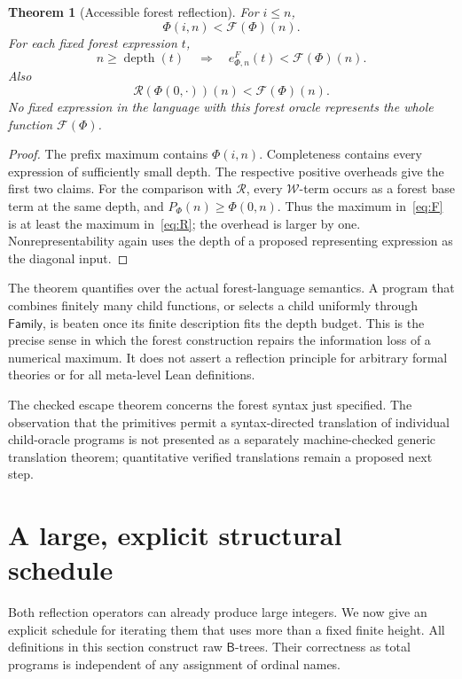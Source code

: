 \documentclass[11pt,a4paper]{article}
\newtheorem{theorem}{Theorem}[section]
\theoremstyle{definition}
\newcommand{\B}{\mathsf B}
\newcommand{\dep}{\operatorname{depth}}
\newcommand{\R}{\mathcal R}
\newcommand{\F}{\mathcal F}
\begin{document}
\begin{theorem}[Accessible forest reflection]
For \(i\le n\),
\[
             \Phi(i,n)<\F(\Phi)(n).
\]
For each fixed forest expression \(t\),
\[
 n\ge\dep(t)\quad\Longrightarrow\quad
 e^F_{\Phi,n}(t)<\F(\Phi)(n).
\]
Also
\[
            \R(\Phi(0,\cdot))(n)<\F(\Phi)(n).
\]
No fixed expression in the language with this forest oracle represents the
whole function \(\F(\Phi)\).
\end{theorem}
\begin{proof}
The prefix maximum contains \(\Phi(i,n)\). Completeness contains every
expression of sufficiently small depth. The respective positive overheads
give the first two claims. For the comparison with \(\R\), every
\(\mathcal W\)-term occurs as a forest base term at the same depth, and
\(P_\Phi(n)\ge\Phi(0,n)\). Thus the maximum in~\eqref{eq:F} is at least the
maximum in~\eqref{eq:R}; the overhead is larger by one. Nonrepresentability
again uses the depth of a proposed representing expression as the diagonal
input.
\end{proof}

The theorem quantifies over the actual forest-language semantics. A program
that combines finitely many child functions, or selects a child uniformly
through \(\mathsf{Family}\), is beaten once its finite description fits the
depth budget. This is the precise sense in which the forest construction
repairs the information loss of a numerical maximum. It does not assert a
reflection principle for arbitrary formal theories or for all meta-level
Lean definitions.

The checked escape theorem concerns the forest syntax just specified.
The observation that the primitives permit a syntax-directed translation
of individual child-oracle programs is not presented as a separately
machine-checked generic translation theorem; quantitative verified
translations remain a proposed next step.

\section{A large, explicit structural schedule}
\label{sec:schedule}

Both reflection operators can already produce large integers. We now give
an explicit schedule for iterating them that uses more than a fixed finite
height. All definitions in this section construct raw \(\B\)-trees. Their
correctness as total programs is independent of any assignment of ordinal
names.
\end{document}
